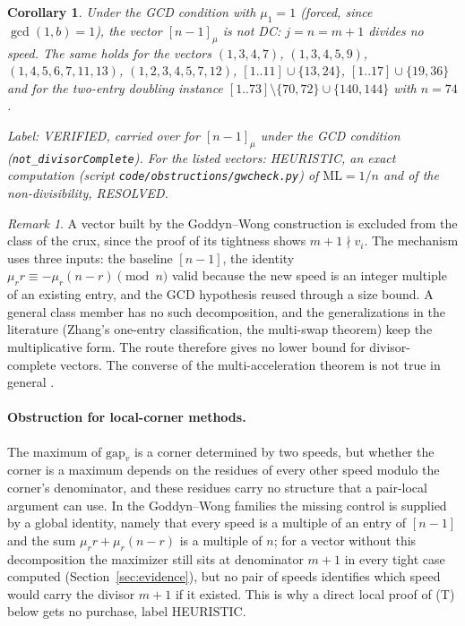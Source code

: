 \documentclass[11pt]{article}
\newtheorem{corollary}[theorem]{Corollary}
\theoremstyle{remark}
\newtheorem{remark}[theorem]{Remark}
\newcommand{\ML}{\mathrm{ML}}
\newcommand{\gap}{\mathrm{gap}}
\newcommand{\lab}[1]{\par\smallskip\noindent\textit{Label: #1.}}
\begin{document}
\begin{corollary}\label{cor:GWDC}
Under the GCD condition with $\mu_1=1$ (forced, since $\gcd(1,b)=1$), the vector $[n-1]_\mu$ is not DC: $j=n=m+1$ divides no speed. The same holds for the vectors $(1,3,4,7)$, $(1,3,4,5,9)$, $(1,4,5,6,7,11,13)$, $(1,2,3,4,5,7,12)$, $[1..11]\cup\{13,24\}$, $[1..17]\cup\{19,36\}$ and for the two-entry doubling instance $[1..73]\setminus\{70,72\}\cup\{140,144\}$ with $n=74$ \cite[Cor.~5.2 and the example following Thm.~5.1]{Zhang26}.
\end{corollary}
\lab{VERIFIED, carried over for $[n-1]_\mu$ under the GCD condition (\texttt{not\_divisorComplete}). For the listed vectors: HEURISTIC, an exact computation (script \texttt{code/obstructions/gwcheck.py}) of $\ML=1/n$ and of the non-divisibility, RESOLVED}

\begin{remark}
A vector built by the Goddyn--Wong construction is excluded from the class of the crux, since the proof of its tightness shows $m+1\nmid v_i$. The mechanism uses three inputs: the baseline $[n-1]$, the identity $\mu_rr\equiv-\mu_r(n-r)\pmod n$ valid because the new speed is an integer multiple of an existing entry, and the GCD hypothesis reused through a size bound. A general class member has no such decomposition, and the generalizations in the literature (Zhang's one-entry classification, the multi-swap theorem) keep the multiplicative form. The route therefore gives no lower bound for divisor-complete vectors. The converse of the multi-acceleration theorem is not true in general \cite[Question~9.3]{Zhang26}.
\end{remark}

\paragraph{Obstruction for local-corner methods.} The maximum of $\gap_v$ is a corner determined by two speeds, but whether the corner is a maximum depends on the residues of every other speed modulo the corner's denominator, and these residues carry no structure that a pair-local argument can use. In the Goddyn--Wong families the missing control is supplied by a global identity, namely that every speed is a multiple of an entry of $[n-1]$ and the sum $\mu_rr+\mu_r(n-r)$ is a multiple of $n$; for a vector without this decomposition the maximizer still sits at denominator $m+1$ in every tight case computed (Section~\ref{sec:evidence}), but no pair of speeds identifies which speed would carry the divisor $m+1$ if it existed. This is why a direct local proof of (T) below gets no purchase, label HEURISTIC.
\end{document}
